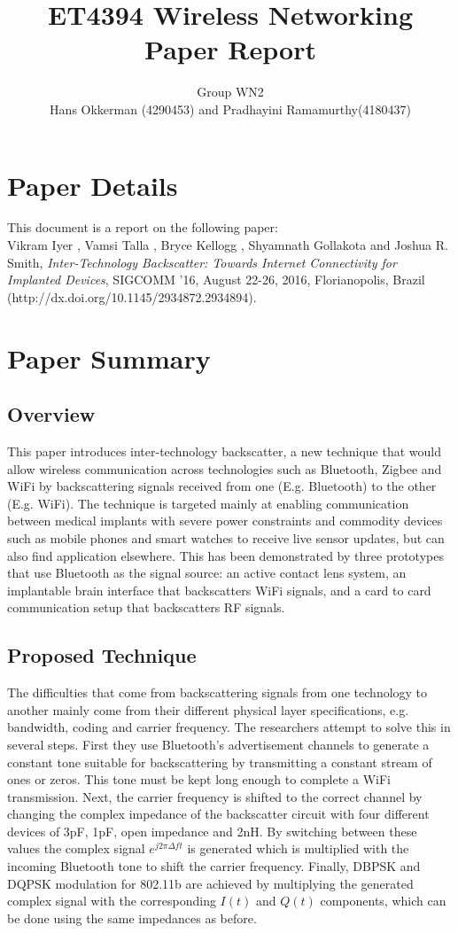 \documentclass[a4paper]{article}
\title{ET4394 Wireless Networking 
\\Paper Report}
\author{Group WN2
\\Hans Okkerman (4290453) and Pradhayini Ramamurthy(4180437)}
\begin{document}
\maketitle

\section{Paper Details}
This document is a report on the following paper:
\\ Vikram Iyer , Vamsi Talla , Bryce Kellogg , Shyamnath Gollakota and Joshua R. Smith, \textit{Inter-Technology Backscatter: Towards Internet Connectivity for Implanted Devices}, SIGCOMM ’16, August 22-26, 2016, Florianopolis, Brazil (http://dx.doi.org/10.1145/2934872.2934894).

\section{Paper Summary}
\subsection{Overview}
This paper introduces inter-technology backscatter, a new technique that would allow wireless communication across technologies such as Bluetooth, Zigbee and WiFi by backscattering signals received from one (E.g. Bluetooth) to the other (E.g. WiFi). The technique is targeted mainly at enabling communication between medical implants with severe power constraints and commodity devices such as mobile phones and smart watches to receive live sensor updates, but can also find application elsewhere. This has been demonstrated by three prototypes that use Bluetooth as the signal source: an active contact lens system, an implantable brain interface that backscatters WiFi signals, and a card to card communication setup that backscatters RF signals. 

\subsection{Proposed Technique}
The difficulties that come from backscattering signals from one technology to another mainly come from their different physical layer specifications, e.g. bandwidth, coding and carrier frequency. The researchers attempt to solve this in several steps. First they use Bluetooth's advertisement channels to generate a constant tone suitable for backscattering by transmitting a constant stream of ones or zeros. This tone must be kept long enough to complete a WiFi transmission. Next, the carrier frequency is shifted to the correct channel by changing the complex impedance of the backscatter circuit with four different devices of 3pF, 1pF, open impedance and 2nH. By switching between these values the complex signal $e^{j2 \pi \Delta ft}$ is generated which is multiplied with the incoming Bluetooth tone to shift the carrier frequency. Finally, DBPSK and DQPSK modulation for 802.11b are achieved by multiplying the generated complex signal with the corresponding $I(t)$ and $Q(t)$ components, which can be done using the same impedances as before. 
\end{document}
